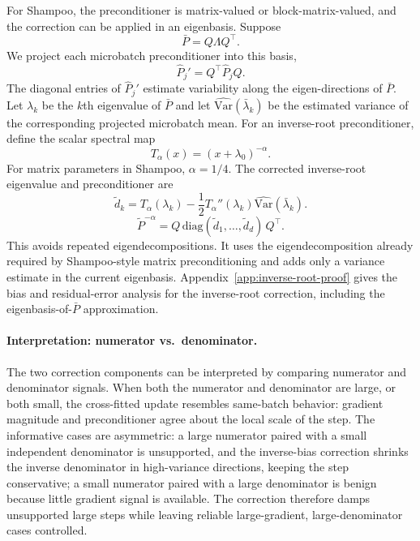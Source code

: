 \documentclass{article}
\newcommand{\Var}{\mathrm{Var}}
\begin{document}
For Shampoo, the preconditioner is matrix-valued or block-matrix-valued, and the correction can be applied in an eigenbasis. Suppose
\begin{equation}
    \bar P = Q\Lambda Q^\top.
\end{equation}
We project each microbatch preconditioner into this basis,
\begin{equation}
    \hat P_j' = Q^\top \hat P_j Q.
\end{equation}
The diagonal entries of $\hat P_j'$ estimate variability along the eigen-directions of $\bar P$. Let $\lambda_k$ be the $k$th eigenvalue of $\bar P$ and let $\widehat{\Var}(\bar \lambda_k)$ be the estimated variance of the corresponding projected microbatch mean. For an inverse-root preconditioner, define the scalar spectral map
\begin{equation}
    T_\alpha(x)=(x+\lambda_0)^{-\alpha}.
\end{equation}
For matrix parameters in Shampoo, $\alpha=1/4$. The corrected inverse-root eigenvalue and preconditioner are
\begin{equation}
    \widetilde d_k
    =
    T_\alpha(\lambda_k)
    -
    \frac{1}{2}T_\alpha''(\lambda_k)\widehat{\Var}(\bar \lambda_k).
\end{equation}
\begin{equation}
    \widetilde P^{-\alpha}
    =
    Q\,\mathrm{diag}(\widetilde d_1,\ldots,\widetilde d_d)\,Q^\top.
\end{equation}
This avoids repeated eigendecompositions. It uses the eigendecomposition already required by Shampoo-style matrix preconditioning and adds only a variance estimate in the current eigenbasis. Appendix~\ref{app:inverse-root-proof} gives the bias and residual-error analysis for the inverse-root correction, including the eigenbasis-of-$\bar P$ approximation.

\paragraph{Interpretation: numerator vs.\ denominator.}
The two correction components can be interpreted by comparing numerator and denominator signals. When both the numerator and denominator are large, or both small, the cross-fitted update resembles same-batch behavior: gradient magnitude and preconditioner agree about the local scale of the step. The informative cases are asymmetric: a large numerator paired with a small independent denominator is unsupported, and the inverse-bias correction shrinks the inverse denominator in high-variance directions, keeping the step conservative; a small numerator paired with a large denominator is benign because little gradient signal is available. The correction therefore damps unsupported large steps while leaving reliable large-gradient, large-denominator cases controlled.
\end{document}
